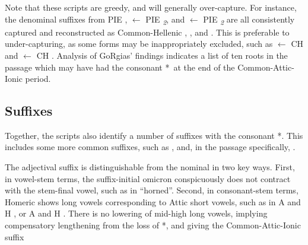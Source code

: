 Note that these scripts are greedy, and will generally over-capture. For instance, the denominal suffixes  from PIE ,  $\gets$ PIE \textit{\textsubscript{2}}, and  $\gets$ PIE \textit{\textsubscript{2}} are all consistently captured and reconstructed as Common-Hellenic , , and . This is preferable to under-capturing, as some forms may be inappropriately excluded, such as  $\gets$ CH  and  $\gets$ CH  . Analysis of GoRgias' findings indicates a list of ten roots in the passage which may have had the consonant *\w\ at the end of the Common-Attic-Ionic period.



\subsection{Suffixes}


Together, the scripts also identify a number of suffixes with the consonant *\w.
This includes some more common suffixes, such as , and,
in the passage specifically, .

The adjectival suffix  is distinguishable from the nominal  in two key ways. First, in vowel-stem terms, the suffix-initial omicron  conspicuously does not contract with the stem-final vowel, such as in  ``horned''. Second, in consonant-stem terms, Homeric shows long vowels corresponding to Attic short vowels, such as in A  and H , or A  and H . There is no lowering of mid-high long vowels, implying compensatory lengthening from the loss of *\w, and giving the Common-Attic-Ionic suffix 

